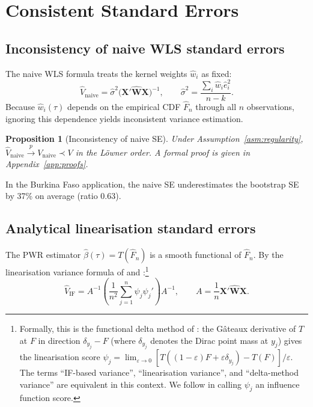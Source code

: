 \documentclass[12pt,a4paper]{article}
\newtheorem{proposition}{Proposition}
\theoremstyle{definition}
\newcommand{\bX}{\mathbf{X}}
\newcommand{\hbeta}{\hat{\beta}}
\newcommand{\hw}{\hat{w}}
\newcommand{\hF}{\hat{F}}
\begin{document}
\section{Consistent Standard Errors}
\label{sec:se}

\subsection{Inconsistency of naive WLS standard errors}

The naive WLS formula treats the kernel weights $\hw_i$ as fixed:
\begin{equation}
  \hat{V}_{\mathrm{naive}} = \hat\sigma^2
  \bigl(\bX'\hat{\bm{W}}\bX\bigr)^{-1},\qquad
  \hat\sigma^2 = \frac{\sum_i \hw_i\hat{e}_i^2}{n-k}.
  \label{eq:naive}
\end{equation}
Because $\hw_i(\tau)$ depends on the empirical CDF $\hF_n$ through all
$n$ observations, ignoring this dependence yields inconsistent variance
estimation.

\begin{proposition}[Inconsistency of naive SE]
\label{prop:inconsistent}
Under Assumption~\ref{asm:regularity},
$\hat{V}_{\mathrm{naive}} \xrightarrow{p} V_{\mathrm{naive}} \prec V$
in the L\"{o}wner order. A formal proof is given in
Appendix~\ref{app:proofs}.
\end{proposition}

In the Burkina Faso application, the naive SE underestimates the
bootstrap SE by 37\% on average (ratio 0.63).

\subsection{Analytical linearisation standard errors}
\label{sec:se:analytic}

The PWR estimator $\hbeta(\tau) = T(\hF_n)$ is a smooth functional of
$\hF_n$. By the linearisation variance formula of \citet{Rao1979} and
\citet{Deville1999}:\footnote{Formally, this is the
functional delta method of \citet{vonMises1947}: the G\^{a}teaux
derivative of $T$ at $F$ in direction $\delta_{y_j} - F$ (where
$\delta_{y_j}$ denotes the Dirac point mass at $y_j$) gives the
linearisation score $\psi_j = \lim_{\varepsilon\to 0}[T((1-\varepsilon)
F+\varepsilon\delta_{y_j})-T(F)]/\varepsilon$. The terms
``IF-based variance'', ``linearisation variance'', and
``delta-method variance'' are equivalent in this context. We follow
\citet{FirpoFortinLemieux2009} in calling $\psi_j$ an influence
function score.}
\begin{equation}
  \hat{V}_{\mathrm{IF}} = A^{-1}\!\left(\frac{1}{n^2}\sum_{j=1}^n
  \psi_j\psi_j'\right)\!A^{-1},\qquad
  A = \frac{1}{n}\bX'\hat{\bm{W}}\bX.
  \label{eq:vIF}
\end{equation}
\end{document}
